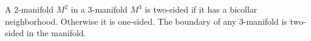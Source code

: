 A 2-manifold $M^2$ in a 3-manifold $M^3$ is two-sided if it has a bicollar neighborhood. Otherwise it is one-sided. The boundary of any 3-manifold is two-sided in the manifold.
